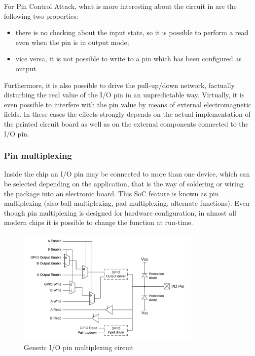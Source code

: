 For Pin Control Attack, what is more interesting about the circuit in \myfig{\ref{fig:pinconf}} are the following two properties:
\begin{itemize}
	\item there is no checking about the input state, so it is possible to perform a read even when the pin is in output mode;
	\item vice versa, it is not possible to write to a pin which has been configured as output.
\end{itemize}

Furthermore, it is also possible to drive the pull-up/down network, factually disturbing the real value of the I/O pin in an unpredictable way.
Virtually, it is even possible to interfere with the pin value by means of external electromagnetic fields.
In these cases the effects strongly depends on the actual implementation of the printed circuit board as well as on the external components connected to the I/O pin.


\subsubsection{Pin multiplexing}

Inside the chip an I/O pin may be connected to more than one device, which can be selected depending on the application,
that is the way of soldering or wiring the package into an electronic board.
This SoC feature is known as pin multiplexing (also ball multiplexing, pad multiplexing, alternate functions).
Even though pin multiplexing is designed for hardware configuration, in almost all modern chips it is possible to change the function at run-time.

\begin{figure}[h]
\centerline{\includegraphics[width=0.8\textwidth]{res/pinmux}}
\caption{Generic I/O pin multiplexing circuit \label{fig:pinmux}}
\end{figure}

